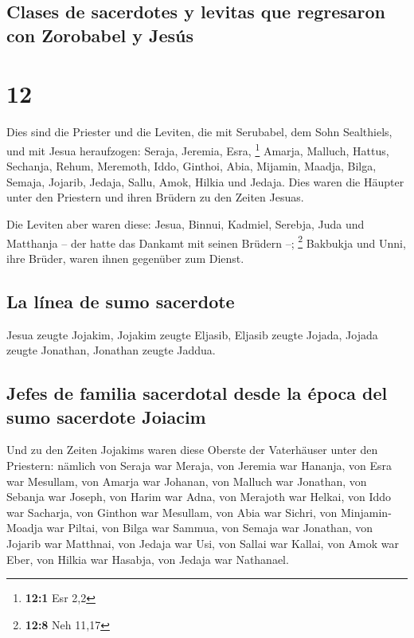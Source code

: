\hypertarget{clases-de-sacerdotes-y-levitas-que-regresaron-con-zorobabel-y-jesuxfas}{%
\subsection{Clases de sacerdotes y levitas que regresaron con Zorobabel
y
Jesús}\label{clases-de-sacerdotes-y-levitas-que-regresaron-con-zorobabel-y-jesuxfas}}

\hypertarget{section-11}{%
\section{12}\label{section-11}}

 Dies sind die Priester und die Leviten, die mit
Serubabel, dem Sohn Sealthiels, und mit Jesua heraufzogen: Seraja,
Jeremia, Esra, \footnote{\textbf{12:1} Esr 2,2}  Amarja,
Malluch, Hattus,  Sechanja, Rehum, Meremoth,
 Iddo, Ginthoi, Abia,  Mijamin, Maadja,
Bilga,  Semaja, Jojarib, Jedaja,  Sallu,
Amok, Hilkia und Jedaja. Dies waren die Häupter unter den Priestern und
ihren Brüdern zu den Zeiten Jesuas.

 Die Leviten aber waren diese: Jesua, Binnui, Kadmiel,
Serebja, Juda und Matthanja -- der hatte das Dankamt mit seinen Brüdern
--; \footnote{\textbf{12:8} Neh 11,17}  Bakbukja und Unni,
ihre Brüder, waren ihnen gegenüber zum Dienst.

\hypertarget{la-luxednea-de-sumo-sacerdote}{%
\subsection{La línea de sumo
sacerdote}\label{la-luxednea-de-sumo-sacerdote}}

 Jesua zeugte Jojakim, Jojakim zeugte Eljasib, Eljasib
zeugte Jojada,  Jojada zeugte Jonathan, Jonathan zeugte
Jaddua.

\hypertarget{jefes-de-familia-sacerdotal-desde-la-uxe9poca-del-sumo-sacerdote-joiacim}{%
\subsection{Jefes de familia sacerdotal desde la época del sumo
sacerdote
Joiacim}\label{jefes-de-familia-sacerdotal-desde-la-uxe9poca-del-sumo-sacerdote-joiacim}}

 Und zu den Zeiten Jojakims waren diese Oberste der
Vaterhäuser unter den Priestern: nämlich von Seraja war Meraja, von
Jeremia war Hananja,  von Esra war Mesullam, von Amarja
war Johanan,  von Malluch war Jonathan, von Sebanja war
Joseph,  von Harim war Adna, von Merajoth war Helkai,
 von Iddo war Sacharja, von Ginthon war Mesullam,
 von Abia war Sichri, von Minjamin-Moadja war Piltai,
 von Bilga war Sammua, von Semaja war Jonathan,
 von Jojarib war Matthnai, von Jedaja war Usi,
 von Sallai war Kallai, von Amok war Eber,
 von Hilkia war Hasabja, von Jedaja war Nathanael.

